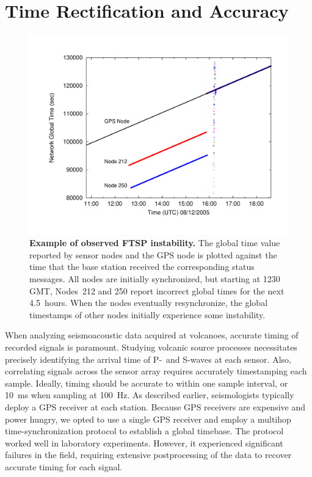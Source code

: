 \section{Time Rectification and Accuracy}
\label{evaluation-sec-timing}

\begin{figure}[t!]
\begin{center}
\includegraphics[width=\hsize]{./5-evaluation/figs/timing/MDW/instability/FTSPINSTABILITY.pdf}
\end{center} 
\caption{\textbf{Example of observed FTSP instability.}
The global time value reported by sensor nodes and the GPS node is plotted
against the time that the base station received the corresponding status
messages. All nodes are initially synchronized, but starting at 1230 GMT,
Nodes~212 and 250 report incorrect global times for the next 4.5~hours. When
the nodes eventually resynchronize, the global timestamps of other nodes
initially experience some instability.}
\label{evaluation-fig-globaltimeproblem}
\end{figure}

When analyzing seismoacoustic data acquired at volcanoes, accurate timing of
recorded signals is paramount. Studying volcanic source processes
necessitates precisely identifying the arrival time of P-~and S-waves at each
sensor. Also, correlating signals across the sensor array requires accurately
timestamping each sample. Ideally, timing should be accurate to within one
sample interval, or 10~ms when sampling at 100~Hz. As described earlier,
seismologists typically deploy a GPS receiver at each station. Because GPS
receivers are expensive and power hungry, we opted to use a single GPS
receiver and employ a multihop time-synchronization protocol to establish a
global timebase. The protocol worked well in laboratory experiments. However,
it experienced significant failures in the field, requiring extensive
postprocessing of the data to recover accurate timing for each signal.

